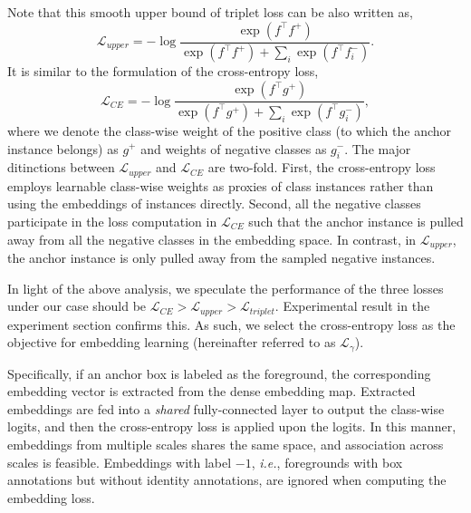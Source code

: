 \documentclass[runningheads]{llncs}
\def\ie{\textit{i.e.}}
\begin{document}
Note that this smooth upper bound of triplet loss can be also written as,
\begin{equation}
    \mathcal{L}_{upper} = - \log \frac{\exp(f^{\top}f^+) }{\exp(f^{\top}f^+) + \sum_i \exp(f^{\top}f^{-}_i) }.
\end{equation}
It is similar to the formulation of the cross-entropy loss,
\begin{equation}
    \mathcal{L}_{CE} = - \log \frac{\exp(f^{\top}g^+) }{\exp(f^{\top}g^+) + \sum_i \exp(f^{\top}g^{-}_i) },
\end{equation}
where we denote the class-wise weight of the positive class (to which the anchor instance belongs) as $g^+$ and weights of negative classes as $g_i^-$. The major ditinctions between $\mathcal{L}_{upper}$ and $\mathcal{L}_{CE}$ are two-fold. First, the cross-entropy loss employs learnable class-wise weights as proxies of class instances rather than using the embeddings of instances directly. Second, all the negative classes participate in the loss computation in $\mathcal{L}_{CE}$ such that the anchor instance is pulled away from all the negative classes in the embedding space. In contrast, in $\mathcal{L}_{upper}$, the anchor instance is only pulled away from the sampled negative instances.

In light of the above analysis, we speculate the performance of the three losses under our case should be $\mathcal{L}_{CE} > \mathcal{L}_{upper} > \mathcal{L}_{triplet}$. Experimental result in the experiment section confirms this. As such, we select the cross-entropy loss as the objective for embedding learning (hereinafter referred to as $\mathcal{L}_{\gamma}$).

Specifically, if an anchor box is labeled as the foreground, the corresponding embedding vector is extracted from the dense embedding map. Extracted embeddings are fed into a \emph{shared} fully-connected layer to output the class-wise logits, and then the  cross-entropy loss is applied upon the logits. In this manner, embeddings from multiple scales shares the same space, and association across scales is feasible. Embeddings with label $-1$, \ie, foregrounds with box annotations but without identity annotations, are ignored when computing the embedding loss. 
\end{document}
